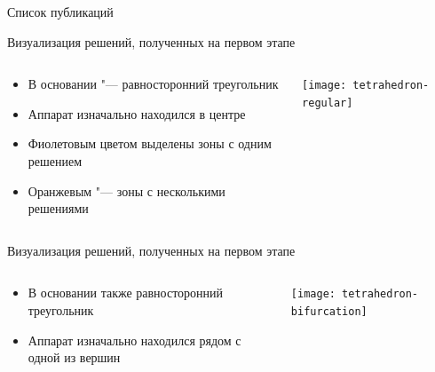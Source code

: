 \documentclass[russian,hyperref={unicode}]{beamer}
\begin{document}
  \begin{frame}[allowframebreaks]{Список публикаций}
    \printbibliography
  \end{frame}

  \frame{\titlepage}

  \appendix
  \begin{frame}{Визуализация решений, полученных на первом этапе}
    \begin{columns}[c]
      \begin{column}{.5\textwidth}
        \begin{itemize}
          \item В основании "--- равносторонний треугольник
          \item Аппарат изначально находился в центре
          \item Фиолетовым цветом выделены зоны с одним решением
          \item Оранжевым "--- зоны с несколькими решениями
        \end{itemize}
      \end{column}
      \begin{column}{.5\textwidth}
        \begin{center}
          \texttt{[image: tetrahedron-regular]}
        \end{center}
      \end{column}
    \end{columns}
  \end{frame}

  \begin{frame}{Визуализация решений, полученных на первом этапе}
    \begin{columns}[c]
      \begin{column}{.5\textwidth}
        \begin{itemize}
          \item В основании также равносторонний треугольник
          \item Аппарат изначально находился рядом с одной из вершин
        \end{itemize}
      \end{column}
      \begin{column}{.5\textwidth}
        \begin{center}
          \texttt{[image: tetrahedron-bifurcation]}
        \end{center}
      \end{column}
    \end{columns}
  \end{frame}
\end{document}
